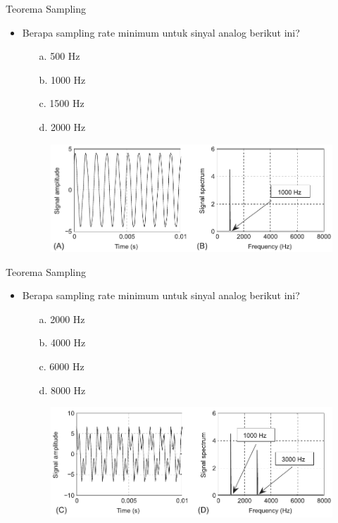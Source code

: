 \documentclass[pdflatex,compress,mathserif]{beamer}
\begin{document}
\begin{frame}{Teorema Sampling}
    \begin{itemize}
        \item Berapa sampling rate minimum untuk sinyal analog berikut ini?
        \begin{multicols}{2}
            \begin{enumerate}
                \item[a.] 500 Hz
                \item[b.] 1000 Hz
                \columnbreak
                \item[c.] 1500 Hz
                \item[d.] 2000 Hz
            \end{enumerate}
        \end{multicols}
        \begin{figure}
            \includegraphics[width=\linewidth]{./img/img06}
        \end{figure}
    \end{itemize}
\end{frame}

\begin{frame}{Teorema Sampling}
    \begin{itemize}
        \item Berapa sampling rate minimum untuk sinyal analog berikut ini?
        \begin{multicols}{2}
            \begin{enumerate}
                \item[a.] 2000 Hz
                \item[b.] 4000 Hz
                \columnbreak
                \item[c.] 6000 Hz
                \item[d.] 8000 Hz
            \end{enumerate}
        \end{multicols}
        \begin{figure}
            \includegraphics[width=\linewidth]{./img/img07}
        \end{figure}
    \end{itemize}
\end{frame}
\end{document}

